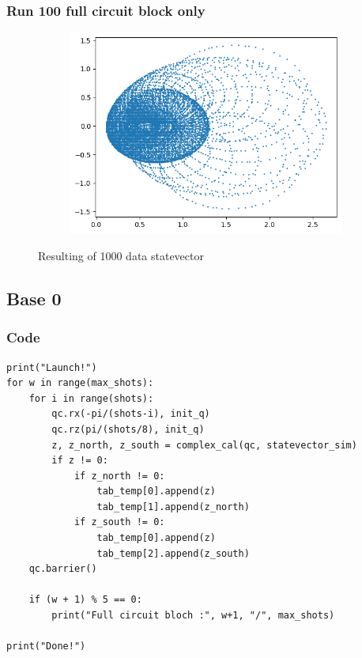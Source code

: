 \subsubsection{Run 100 full circuit block only}
\begin{figure}[ht!]
        \centering
        \begin{subfigure}[c]{0.5\textwidth}
                \includegraphics[width=\textwidth]{Chapitre1/Figures/exp1_100_baseH_halfZ_nonZoom.png}
        \end{subfigure}%
        \caption{Resulting of 1000 data statevector}
\end{figure}

\subsection{Base 0}
\subsubsection{Code}
\begin{lstlisting}
print("Launch!")
for w in range(max_shots):
    for i in range(shots):
        qc.rx(-pi/(shots-i), init_q)
        qc.rz(pi/(shots/8), init_q)
        z, z_north, z_south = complex_cal(qc, statevector_sim)
        if z != 0:
            if z_north != 0:
                tab_temp[0].append(z)
                tab_temp[1].append(z_north)
            if z_south != 0:
                tab_temp[0].append(z)
                tab_temp[2].append(z_south)
    qc.barrier()
    
    if (w + 1) % 5 == 0:
        print("Full circuit bloch :", w+1, "/", max_shots)

print("Done!")
\end{lstlisting}

